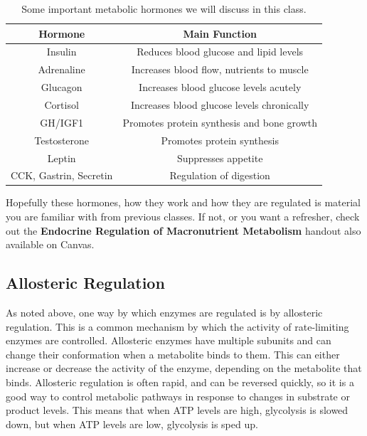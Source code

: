 \documentclass{tufte-handout}
\begin{document}
\begin{table}[h]
\centering
\caption{Some important metabolic hormones we will discuss in this class.}\label{tab:hormones}
\begin{tabular}{cc}
\hline
\textbf{Hormone}       & \textbf{Main Function}                     \\
\hline
Insulin                & Reduces blood glucose and lipid levels     \\
Adrenaline        & Increases blood flow, nutrients to muscle \\
Glucagon               & Increases blood glucose levels acutely     \\
Cortisol               & Increases blood glucose levels chronically \\
GH/IGF1                & Promotes protein synthesis and bone growth \\
Testosterone           & Promotes protein synthesis                 \\
Leptin                 & Suppresses appetite                        \\
CCK, Gastrin, Secretin & Regulation of digestion                   \\
\hline
\end{tabular}
\end{table}


Hopefully these hormones, how they work and how they are regulated is material you are familiar with from previous classes.  If not, or you want a refresher, check out the \textbf{Endocrine Regulation of Macronutrient Metabolism} handout also available on Canvas.  

\subsection{Allosteric Regulation}
As noted above, one way by which enzymes are regulated is by allosteric regulation.  This is a common mechanism by which the activity of rate-limiting enzymes are controlled.  Allosteric enzymes have multiple subunits and can change their conformation when a metabolite binds to them.  This can either increase or decrease the activity of the enzyme, depending on the metabolite that binds.  Allosteric regulation is often rapid, and can be reversed quickly, so it is a good way to control metabolic pathways in response to changes in substrate or product levels.  This means that when ATP levels are high, glycolysis is slowed down, but when ATP levels are low, glycolysis is sped up.
\end{document}
